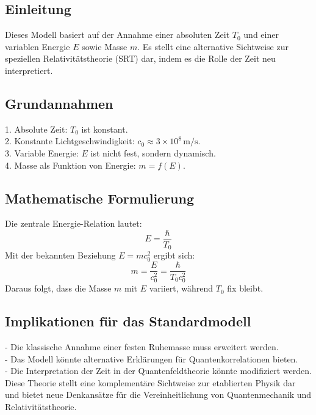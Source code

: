 \documentclass[a4paper,12pt]{article}
\begin{document}
	\subsection{Einleitung}
	Dieses Modell basiert auf der Annahme einer absoluten Zeit \( T_0 \) und einer variablen Energie \( E \) sowie Masse \( m \). Es stellt eine alternative Sichtweise zur speziellen Relativitätstheorie (SRT) dar, indem es die Rolle der Zeit neu interpretiert.
	
	\subsection{Grundannahmen}
	1. Absolute Zeit: \( T_0 \) ist konstant. \\
	2. Konstante Lichtgeschwindigkeit: \( c_0 \approx 3 \times 10^8 \, \text{m/s} \). \\
	3. Variable Energie: \( E \) ist nicht fest, sondern dynamisch. \\
	4. Masse als Funktion von Energie: \( m = f(E) \).
	
	\subsection{Mathematische Formulierung}
	Die zentrale Energie-Relation lautet:
	\[
	E = \frac{\hbar}{T_0}
	\]
	Mit der bekannten Beziehung \( E = m c_0^2 \) ergibt sich:
	\[
	m = \frac{E}{c_0^2} = \frac{\hbar}{T_0 c_0^2}
	\]
	Daraus folgt, dass die Masse \( m \) mit \( E \) variiert, während \( T_0 \) fix bleibt.
	
	\subsection{Implikationen für das Standardmodell}
	- Die klassische Annahme einer festen Ruhemasse muss erweitert werden. \\
	- Das Modell könnte alternative Erklärungen für Quantenkorrelationen bieten. \\
	- Die Interpretation der Zeit in der Quantenfeldtheorie könnte modifiziert werden. \\
	Diese Theorie stellt eine komplementäre Sichtweise zur etablierten Physik dar und bietet neue Denkansätze für die Vereinheitlichung von Quantenmechanik und Relativitätstheorie.
	
\end{document}
